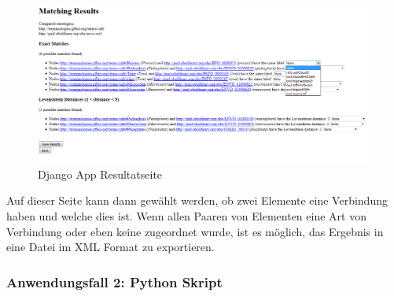 		\begin{figure}[ht]
		\centering
		\includegraphics[width=1.0\textwidth]{pics/TemplateMatchingResultPage.png}
		\caption{Django App Resultatseite}
		\label{fig5}
		\end{figure}
		Auf dieser Seite kann dann gewählt werden, ob zwei Elemente eine Verbindung
		haben und welche dies ist. Wenn allen Paaren von Elementen eine Art von
		Verbindung oder eben keine zugeordnet wurde, ist es möglich, das Ergebnis in
		eine Datei im XML Format zu exportieren.
		
		\subsubsection{Anwendungsfall 2: Python Skript}
